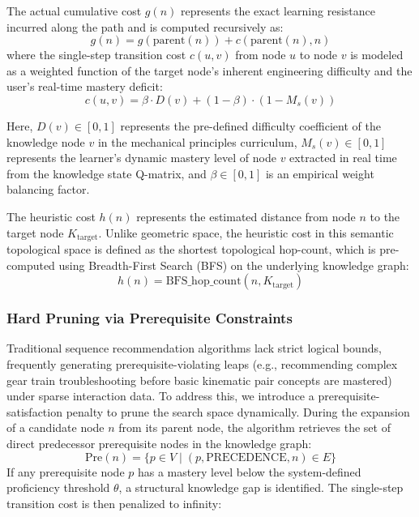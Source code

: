 \documentclass{ieeeaccess}
\begin{document}
The actual cumulative cost $g(n)$ represents the exact learning resistance incurred along the path and is computed recursively as:
\begin{equation}
g(n)=g(\text{parent}(n))+c(\text{parent}(n), n)
\end{equation}
where the single-step transition cost $c(u, v)$ from node $u$ to node $v$ is modeled as a weighted function of the target node's inherent engineering difficulty and the user's real-time mastery deficit:
\begin{equation}
c(u,v) = \beta \cdot D(v) + (1-\beta) \cdot (1 - M_s(v))
\end{equation}

Here, $D(v) \in [0,1]$ represents the pre-defined difficulty coefficient of the knowledge node $v$ in the mechanical principles curriculum, $M_s(v) \in [0,1]$ represents the learner's dynamic mastery level of node $v$ extracted in real time from the knowledge state Q-matrix, and $\beta \in [0,1]$ is an empirical weight balancing factor.

The heuristic cost $h(n)$ represents the estimated distance from node $n$ to the target node $K_{\text{target}}$. Unlike geometric space, the heuristic cost in this semantic topological space is defined as the shortest topological hop-count, which is pre-computed using Breadth-First Search (BFS) on the underlying knowledge graph:
\begin{equation}
h(n) = \text{BFS\_hop\_count}(n, K_{\text{target}})
\end{equation}

\subsubsection{Hard Pruning via Prerequisite Constraints}
Traditional sequence recommendation algorithms lack strict logical bounds, frequently generating prerequisite-violating leaps (e.g., recommending complex gear train troubleshooting before basic kinematic pair concepts are mastered) under sparse interaction data. To address this, we introduce a prerequisite-satisfaction penalty to prune the search space dynamically. During the expansion of a candidate node $n$ from its parent node, the algorithm retrieves the set of direct predecessor prerequisite nodes in the knowledge graph:
\begin{equation}
\text{Pre}(n) = \{p \in V \mid (p, \text{PRECEDENCE}, n) \in E\}
\end{equation}
If any prerequisite node $p$ has a mastery level below the system-defined proficiency threshold $\theta$, a structural knowledge gap is identified. The single-step transition cost is then penalized to infinity:
\end{document}
